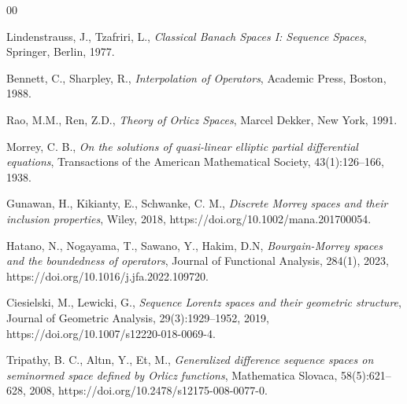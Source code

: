 \documentclass[preprint,12pt]{elsarticle}
\begin{document}
\begin{thebibliography}{00}


   Lindenstrauss, J., Tzafriri,  L., 
  \textit{Classical Banach Spaces I: Sequence Spaces},
  Springer, Berlin,
  1977.

  Bennett, C., Sharpley, R.,
  \textit{Interpolation of Operators},
  Academic Press, Boston,
  1988.

  Rao, M.M., Ren, Z.D.,
  \textit{Theory of Orlicz Spaces},
  Marcel Dekker, New York,
  1991.

   Morrey, C. B.,
  \textit{On the solutions of quasi-linear elliptic partial differential equations},
  Transactions of the American Mathematical Society,
  43(1):126--166,
  1938.

   Gunawan, H., Kikianty, E., Schwanke, C. M.,
  \textit{Discrete Morrey spaces and their inclusion properties},
  Wiley,
  2018,
https://doi.org/10.1002/mana.201700054.

Hatano, N., Nogayama, T., 
 Sawano, Y.,  Hakim, D.N,
  \textit{Bourgain-Morrey spaces and the boundedness of operators},
 Journal of Functional Analysis,
  284(1),
 2023,
https://doi.org/10.1016/j.jfa.2022.109720.

  Ciesielski, M., Lewicki, G.,
  \textit{Sequence Lorentz spaces and their geometric structure},
  Journal of Geometric Analysis,
  29(3):1929--1952,
  2019,
  https://doi.org/10.1007/s12220-018-0069-4.

  Tripathy, B. C., Altın, Y.,  Et, M.,
  \textit{Generalized difference sequence spaces on seminormed space defined by Orlicz functions},
  Mathematica Slovaca,
  58(5):621--628,
  2008,
  https://doi.org/10.2478/s12175-008-0077-0.


\end{thebibliography}
\end{document}
